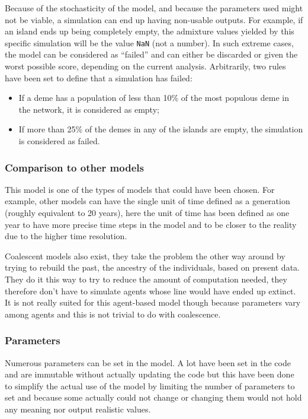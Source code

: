\documentclass[a4paper,12pt]{report}
\begin{document}
Because of the stochasticity of the model, and because the parameters used might not be viable, a simulation can end up having non-usable outputs. For example, if an island ends up being completely empty, the admixture values yielded by this specific simulation will be the value \texttt{NaN} (not a number). In such extreme cases, the model can be considered as “failed” and can either be discarded or given the worst possible score, depending on the current analysis. Arbitrarily, two rules have been set to define that a simulation has failed:
\begin{itemize}
	\item If a deme has a population of less than 10\% of the most populous deme in the network, it is considered as empty;
	\item If more than 25\% of the demes in any of the islands are empty, the simulation is considered as failed.
\end{itemize}

\subsubsection{Comparison to other models}
This model is one of the types of models that could have been chosen. For example, other models can have the single unit of time defined as a generation (roughly equivalent to 20 years), here the unit of time has been defined as one year to have more precise time steps in the model and to be closer to the reality due to the higher time resolution.

Coalescent models also exist, they take the problem the other way around by trying to rebuild the past, the ancestry of the individuals, based on present data. They do it this way to try to reduce the amount of computation needed, they therefore don’t have to simulate agents whose line would have ended up extinct. It is not really suited for this agent-based model though because parameters vary among agents and this is not trivial to do with coalescence.

\subsubsection{Parameters}
Numerous parameters can be set in the model. A lot have been set in the code and are immutable without actually updating the code but this have been done to simplify the actual use of the model by limiting the number of parameters to set and because some actually could not change or changing them would not hold any meaning nor output realistic values.
\end{document}
